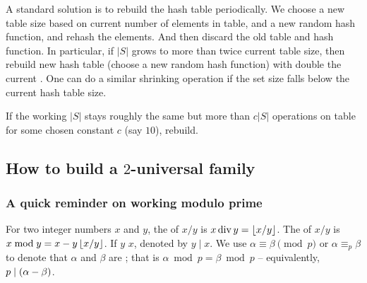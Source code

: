 A standard solution is to rebuild the hash table periodically.  We
choose a new table size based on current number of elements in table,
and a new random hash function, and rehash the elements. And then
discard the old table and hash function.  In particular, if $|S|$
grows to more than twice current table size, then rebuild  new hash
table (choose a new random hash function) with double the current
. One can do a similar shrinking operation if the
set size falls below  the current hash table size.
    
If the working $|S|$ stays roughly the same but more than $c|S|$
operations on table for some chosen constant $c$ (say $10$), rebuild.



\subsection{How to build a $2$-universal family}
\providecommand{\bdiv}{\mathop{\mathrm{div}}}%
\providecommand{\divides}{\mid}%

\subsubsection{A quick reminder on working modulo prime}

\begin{defn}
    
    For two integer numbers $x$ and $y$, the
     of $x/y$ is
    $x \bdiv y = \floor{x/y}$. The 
    of $x/y$ is $x \bmod y = x - y \left\lfloor {x/y} \right\rfloor$. If  $y$
     $x$, denoted by $y \divides x$.  We
    use $\alpha \equiv \beta \pmod{p}$ or $\alpha \equiv_p \beta$ to denote that
    $\alpha$ and $\beta$ are ; that is
    $\alpha \bmod p = \beta \bmod p$ -- equivalently, $p \divides \pth[]{\alpha - \beta}$.
\end{defn}

